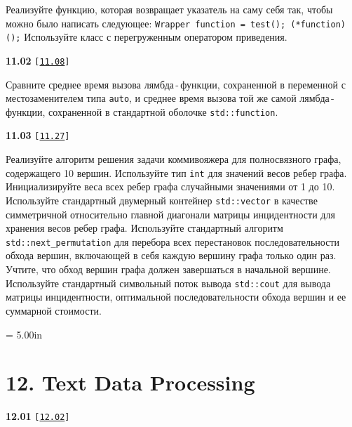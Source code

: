 \documentclass[a4paper,12pt]{article}
\begin{document}
Реализуйте функцию, которая возвращает указатель на саму себя так, чтобы можно было написать следующее: \lstinline{Wrapper function = test(); (*function)();} Используйте класс с перегруженным оператором приведения.

\bigskip

{\large \textbf{11.02} \texttt{[\href{https://github.com/i-s-m-mipt/Education/blob/master/projects/examples/source/11.08.cpp}{\texttt{11.08}}]}}

\bigskip

Сравните среднее время вызова лямбда\,-\,функции, сохраненной в переменной с местозаменителем типа \lstinline{auto}, и среднее время вызова той же самой лямбда\,-\,функции, сохраненной в стандартной оболочке \lstinline{std::function}.

\bigskip

{\large \textbf{11.03} \texttt{[\href{https://github.com/i-s-m-mipt/Education/blob/master/projects/examples/source/11.27.cpp}{\texttt{11.27}}]}}

\bigskip

Реализуйте алгоритм решения задачи коммивояжера для полносвязного графа, содержащего 10 вершин. Используйте тип \lstinline{int} для значений весов ребер графа. Инициализируйте веса всех ребер графа случайными значениями от 1 до 10. Используйте стандартный двумерный контейнер \lstinline{std::vector} в качестве симметричной относительно главной диагонали матрицы инцидентности для хранения весов ребер графа. Используйте стандартный алгоритм \lstinline{std::next_permutation} для перебора всех перестановок последовательности обхода вершин, включающей в себя каждую вершину графа только один раз. Учтите, что обход вершин графа должен завершаться в начальной вершине. Используйте стандартный символьный поток вывода \lstinline{std::cout} для вывода матрицы инцидентности, оптимальной последовательности обхода вершин и ее суммарной стоимости.



\newpage\thispagestyle{empty}\pdfpageheight = 5.00in\enlargethispage{100in}

\section{12. Text Data Processing}

{\large \textbf{12.01} \texttt{[\href{https://github.com/i-s-m-mipt/Education/blob/master/projects/examples/source/12.02.cpp}{\texttt{12.02}}]}}

\bigskip
\end{document}
